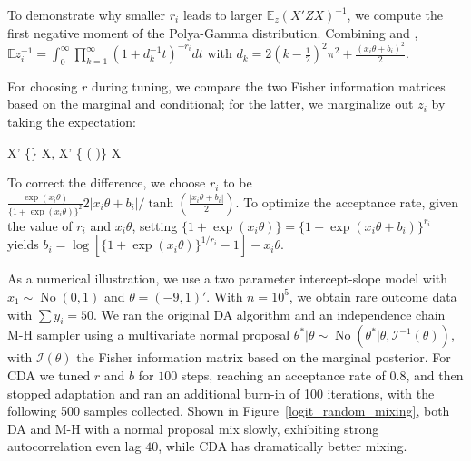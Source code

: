 \documentclass[10pt]{article}
\newcommand{\xbeta}{ x_i \theta}
\newcommand{\be}{\begin{equs}}
\newcommand{\ee}{\end{equs}}
\newcommand{\bb}[1]{\mathbb{#1}}
\newcommand{\mc}[1]{\mathcal{#1}}
\DeclareMathOperator{\No}{No}
\DeclareMathOperator{\diag}{diag}
\begin{document}
To demonstrate why smaller $r_i$ leads to larger $\bb E_z (X' Z X)^{-1}$, we compute the  first negative moment of the Polya-Gamma distribution. Combining \cite{cressie1981moment} and \cite{polson2013bayesian}, $\bb{E}z_i^{-1}= \int_0^{\infty} \prod_{k=1}^{\infty} (1+ d_k^{-1} t) ^{-r_i} dt$ with $d_k=2(k-\frac{1}{2})^2\pi^2 + \frac{(x_i\theta+b_i)^2}{2}$.

For choosing $r$ during tuning, we compare the two Fisher information matrices based on the marginal and conditional; for the latter, we marginalize out $z_i$ by taking the expectation:
\be
X' \diag\bigg\{\frac{\exp(\xbeta)}{ \{1+\exp(\xbeta)\} ^2}\bigg\} X, \quad X'  \diag\bigg\{ \frac{r_i}{2 |\xbeta+b_i|}\tanh\Big(\frac{|\xbeta+b_i|}{2} \Big)\bigg\} X
\ee
To correct the difference, we choose $r_i$ to be $\frac{\exp(\xbeta)}{ \{1+\exp(\xbeta)\} ^2} {2 |\xbeta+b_i|}/ \tanh(\frac{|\xbeta+b_i|}{2})$. To optimize the acceptance rate, given the value of $r_i$ and $\xbeta$,  setting $ \{1+\exp(\xbeta)\}  = \{1+\exp(\xbeta+b_i)\}^{r_i}  $ yields $b_i = \log[  \{1+\exp(\xbeta)\}^{1/r_i} -1] - \xbeta$.


As a numerical illustration, we use a two parameter intercept-slope model with $x_1\sim \No(0,1)$ and $\theta=(-9,1)'$. With $n= 10^5$, we obtain rare outcome data with 
 $\sum y_{i} = 50 $.  We ran the original DA algorithm  \citep{polson2013bayesian} and an independence chain M-H sampler using a multivariate normal proposal $\theta^*|\theta \sim \No(\theta^*| \theta, {\mc I}^{-1}(\theta))$, with ${\mc I}(\theta)$ the Fisher information matrix based on the marginal posterior. For CDA we tuned $r$ and $b$ for $100$ steps, reaching an acceptance rate of $0.8$, and then stopped adaptation and ran an additional burn-in of 100 iterations, with the following 500 samples collected.  Shown in Figure~\ref{logit_random_mixing}, both DA and M-H with a normal proposal mix slowly, exhibiting strong autocorrelation even lag $40$, while CDA has dramatically better mixing.
\end{document}
